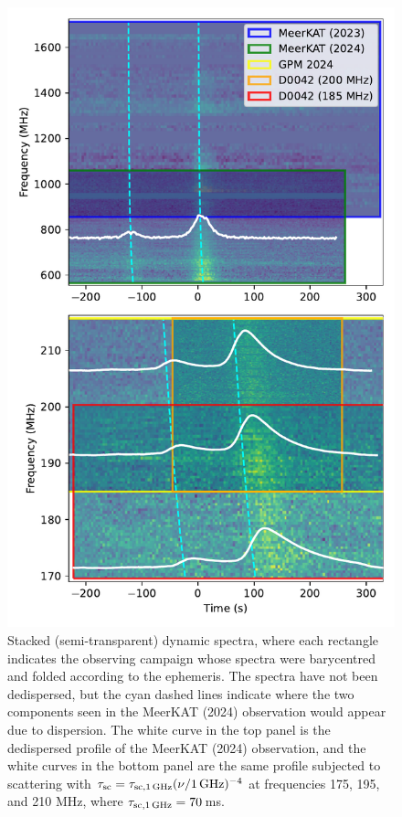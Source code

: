 \documentclass[fleqn,usenatbib]{mnras}
\begin{document}
\begin{figure}
      \centering
          \includegraphics[width=0.95\linewidth]{stacked_spectra.pdf}
              \caption{Stacked (semi-transparent) dynamic spectra, where each rectangle indicates the observing campaign whose spectra were barycentred and folded according to the ephemeris. The spectra have not been dedispersed, but the cyan dashed lines indicate where the two components seen in the MeerKAT (2024) observation would appear due to dispersion. The white curve in the top panel is the dedispersed profile of the MeerKAT (2024) observation, and the white curves in the bottom panel are the same profile subjected to scattering with $\tau_{\rm sc} = \tau_{\rm sc,1\,GHz} (\nu/{\rm 1\,GHz})^{-4}$ at frequencies 175, 195, and 210 MHz, where $\tau_{\rm sc,1\,GHz} = 70$\,ms.}
                  \label{fig:stacked_spectra}
\end{figure}
\end{document}
